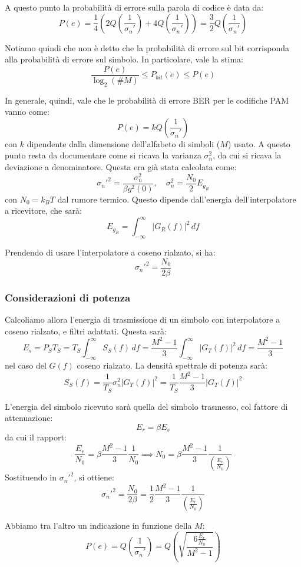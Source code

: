 \documentclass[a4paper,11pt]{article}
\begin{document}
A questo punto la probabilità di errore sulla parola di codice è data da:
$$
P(e) = \frac{1}{4} \left( 2 Q \left( \frac{1}{\sigma_n'} \right) + 4 Q \left( \frac{1}{\sigma_n'} \right) \right) = \frac{3}{2} Q \left( \frac{1}{\sigma_n'} \right)
$$

Notiamo quindi che non è detto che la probabilità di errore sul bit corrisponda alla probabilità di errore sul simbolo. In particolare, vale la stima:
$$
\frac{P(e)}{\log_2 (\# M)} \leq P_{bit}(e) \leq P(e)
$$

In generale, quindi, vale che le probabilità di errore BER per le codifiche PAM vanno come:
$$
P(e) = k Q\left( \frac{1}{\sigma_n'} \right)
$$
con $k$ dipendente dalla dimensione dell'alfabeto di simboli ($M$) usato.
A questo punto resta da documentare come si ricava la varianza $\sigma_n^2$, da cui si ricava la deviazione a denominatore. Questa era già stata calcolata come:
$$
\sigma_n'^2 = \frac{\sigma_n^2}{\beta g^2(0)}, \quad \sigma_n^2 = \frac{N_0}{2} E_{g_R}
$$
con $N_0 = k_B T$ dal rumore termico.
Questo dipende dall'energia dell'interpolatore a ricevitore, che sarà:
$$
E_{g_R} = \int_{-\infty}^{\infty} | G_R(f) |^2 \, df
$$

Prendendo di usare l'interpolatore a coseno rialzato, si ha:
$$
\sigma_n'^2 = \frac{N_0}{2 \beta}
$$

\subsubsection{Considerazioni di potenza}

Calcoliamo allora l'energia di trasmissione di un simbolo con interpolatore a coseno rialzato, e filtri adattati. Questa sarà:
$$
E_s = P_S T_S = T_S \int_{-\infty}^{\infty} S_S(f) \, df = \frac{M^2 - 1}{3} \int_{-\infty}^{\infty} | G_T(f) |^2 \, df = \frac{M^2 - 1}{3}
$$
nel caso del $G(f)$ coseno rialzato. La densità spettrale di potenza sarà:
$$
S_S(f) = \frac{1}{T_S} \sigma_n^2 | G_T(f) |^2 = \frac{1}{T_S} \frac{M^2 - 1}{3} | G_T(f) |^2
$$

L'energia del simbolo ricevuto sarà quella del simbolo trasmesso, col fattore di attenuazione:
$$
E_r = \beta E_s
$$
da cui il rapport:
$$
\frac{E_r}{N_0} = \beta \frac{M^2 - 1}{3} \frac{1}{N_0} \implies N_0 = \beta \frac{M^2 - 1}{3} \frac{1}{\left(\frac{E_r}{N_0}\right)}
$$
Sostituendo in $\sigma_n'^2$, si ottiene:
$$
\sigma_n'^2 = \frac{N_0}{2 \beta} = \frac{1}{2} \frac{M^2 - 1}{3} \frac{1}{\left(\frac{E_r}{N_0}\right)}
$$

Abbiamo tra l'altro un indicazione in funzione della $M$:
$$
P(e) =  Q \left( \frac{1}{\sigma_n'} \right) = Q \left( \sqrt{\frac{6 \frac{E_r}{N_0} }{M^2 - 1}} \right) 
$$
\end{document}

